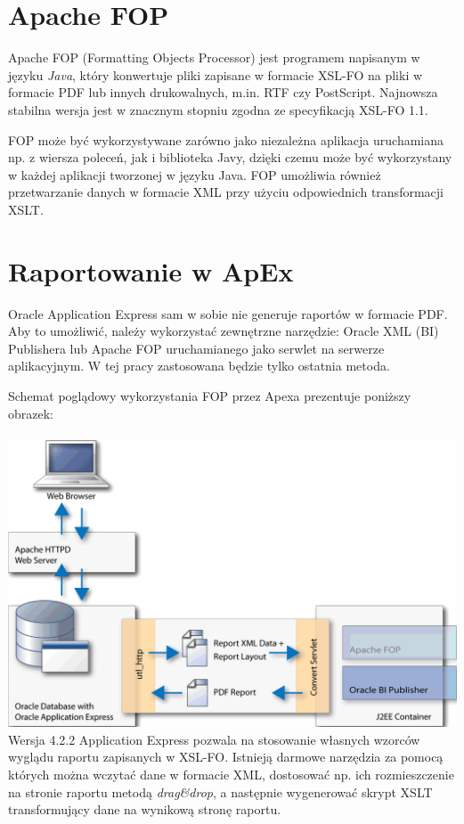 \documentclass[11pt,a4paper]{article}
\begin{document}
\section{Apache FOP}\label{sec:fop}
Apache FOP (Formatting Objects Processor) jest programem napisanym w języku \emph{Java}, który konwertuje pliki zapisane w formacie XSL-FO na pliki w formacie PDF lub innych drukowalnych, m.in. RTF czy PostScript. Najnowsza stabilna wersja jest w znacznym stopniu zgodna ze specyfikacją XSL-FO 1.1. 

FOP może być wykorzystywane zarówno jako niezależna aplikacja uruchamiana np. z wiersza poleceń, jak i biblioteka Javy, dzięki czemu może być wykorzystany w każdej aplikacji tworzonej w języku Java. FOP umożliwia również przetwarzanie danych w formacie XML przy użyciu odpowiednich transformacji XSLT.

\section{Raportowanie w ApEx}\label{sec:raporapex}
Oracle Application Express sam w sobie nie generuje raportów w formacie PDF. Aby to umożliwić, należy wykorzystać zewnętrzne narzędzie: Oracle XML (BI) Publishera lub Apache FOP uruchamianego jako serwlet na serwerze aplikacyjnym. W tej pracy zastosowana będzie tylko ostatnia metoda.

Schemat poglądowy wykorzystania FOP przez Apexa prezentuje poniższy obrazek:\\\\
\includegraphics[scale=0.5]{apex_fop_usage}\\


Wersja 4.2.2 Application Express pozwala na stosowanie własnych wzorców wyglądu raportu zapisanych w XSL-FO. Istnieją darmowe narzędzia za pomocą których można wczytać dane w formacie XML, dostosować np. ich rozmieszczenie na stronie raportu metodą \emph{drag\&drop}, a następnie wygenerować skrypt XSLT transformujący dane na wynikową stronę raportu. 
\end{document}
